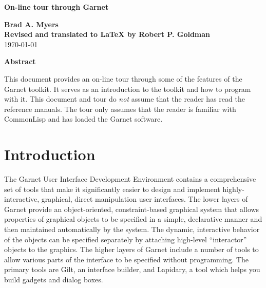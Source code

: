 \begin{titlepage}
\vspace{0.6in}
\begin{center}
  {\Large \textbf{On-line tour through Garnet}}

  {\large {\bf Brad A. Myers}} \\
  \textbf{Revised and translated to LaTeX by Robert P. Goldman}\\
  \vspace{0.3in}
  \today{}
\end{center}
\vspace{\fill}
\begin{center}
{\bf Abstract}\end{center}

This document provides an on-line tour through some of the features of the
Garnet toolkit.  It serves as an introduction to the toolkit and how to
program with it.  This document and tour do {\it not} assume that the reader
has read the reference manuals.  The tour only assumes that the reader is
familiar with CommonLisp and has loaded the Garnet software.

\vspace{0.5in}

\end{titlepage}

\tableofcontents{}


%
\chapter{Introduction}
The Garnet User Interface Development Environment contains a comprehensive
set of tools that make it significantly easier to design and implement
highly-interactive, graphical, direct manipulation user interfaces.  The
lower layers of Garnet provide an object-oriented, constraint-based
graphical system that allows properties of graphical objects to be
specified in a simple, declarative manner and then maintained automatically
by the system.  The dynamic, interactive behavior of the objects can be
specified separately by attaching high-level ``interactor'' objects to the
graphics.  The higher layers of Garnet include a number of tools to allow
various parts of the interface to be specified without programming.
The primary tools are Gilt, an interface builder, and Lapidary, a tool which
helps you build gadgets and dialog boxes.

